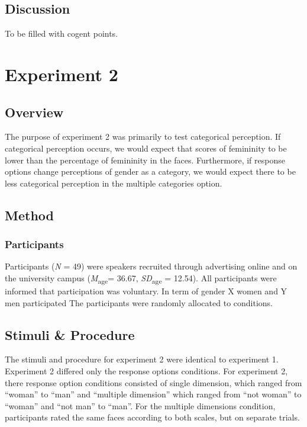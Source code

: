\documentclass[
  man]{apa7}
\begin{document}
\hypertarget{discussion}{%
\subsection{Discussion}\label{discussion}}

To be filled with cogent points.

\hypertarget{experiment-2}{%
\section{Experiment 2}\label{experiment-2}}

\hypertarget{overview}{%
\subsection{Overview}\label{overview}}

The purpose of experiment 2 was primarily to test categorical perception. If categorical perception occurs, we would expect that scores of femininity to be lower than the percentage of femininity in the faces. Furthermore, if response options change perceptions of gender as a category, we would expect there to be less categorical perception in the multiple categories option.

\hypertarget{method-1}{%
\subsection{Method}\label{method-1}}

\hypertarget{participants-1}{%
\subsubsection{Participants}\label{participants-1}}

Participants (\emph{N} = 49) were speakers recruited through advertising online and on the university campus (\emph{M}\textsubscript{age}= 36.67, \emph{SD}\textsubscript{age} = 12.54). All participants were informed that participation was voluntary. In term of gender X women and Y men participated The participants were randomly allocated to conditions.

\hypertarget{stimuli-procedure}{%
\subsection{Stimuli \& Procedure}\label{stimuli-procedure}}

The stimuli and procedure for experiment 2 were identical to experiment 1. Experiment 2 differed only the response options conditions. For experiment 2, there response option conditions consisted of single dimension, which ranged from ``woman'' to ``man'' and ``multiple dimension'' which ranged from ``not woman'' to ``woman'' and ``not man'' to ``man''. For the multiple dimensions condition, participants rated the same faces according to both scales, but on separate trials.
\end{document}
